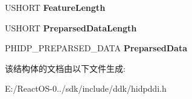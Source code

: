 \begin{DoxyCompactItemize}
U\+S\+H\+O\+RT {\bfseries Feature\+Length}
\item 
\mbox{\label{struct___h_i_d_p___c_o_l_l_e_c_t_i_o_n___d_e_s_c_aab7620fc8c8ce11bcd90fcfe9d59f5aa}} 
U\+S\+H\+O\+RT {\bfseries Preparsed\+Data\+Length}
\item 
\mbox{\label{struct___h_i_d_p___c_o_l_l_e_c_t_i_o_n___d_e_s_c_a8044f13f89d0dd5734243bf36acd5d75}} 
P\+H\+I\+D\+P\+\_\+\+P\+R\+E\+P\+A\+R\+S\+E\+D\+\_\+\+D\+A\+TA {\bfseries Preparsed\+Data}
\end{DoxyCompactItemize}


该结构体的文档由以下文件生成\+:\begin{DoxyCompactItemize}
\item 
E\+:/\+React\+O\+S-\/0../sdk/include/ddk/hidpddi.\+h\end{DoxyCompactItemize}
